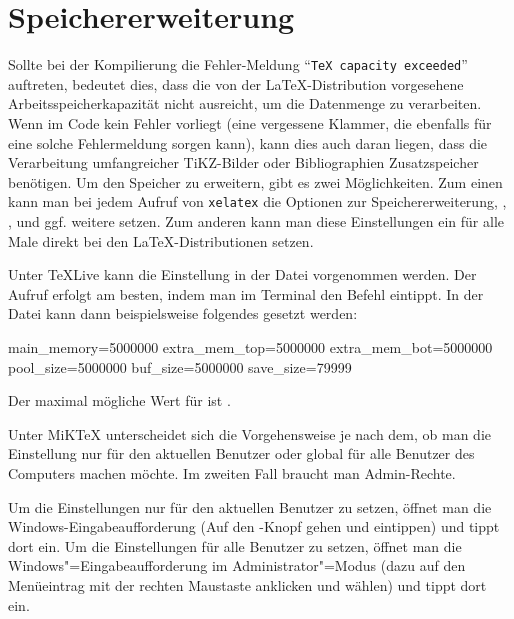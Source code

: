 \section{Speichererweiterung}%
%
\label{sec:Speichererweiterung}
%
Sollte bei der Kompilierung die Fehler-Meldung \enquote{\texttt{TeX capacity exceeded}} auftreten,
bedeutet dies, dass die von der \LaTeX-Distribution vorgesehene Arbeitsspeicherkapazität
nicht ausreicht, um die Datenmenge zu verarbeiten.
Wenn im Code kein Fehler vorliegt (\zB eine vergessene Klammer,
die ebenfalls für eine solche Fehlermeldung sorgen kann),
kann dies auch daran liegen, dass die Verarbeitung umfangreicher TiKZ-Bilder oder Bibliographien 
Zusatzspeicher benötigen.
Um den Speicher zu erweitern, gibt es zwei Möglichkeiten.
Zum einen kann man bei jedem Aufruf von \texttt{xelatex} die Optionen zur Speichererweiterung,
\zB {}, ,  und ggf. weitere setzen.
Zum anderen kann man diese Einstellungen ein für alle Male direkt bei den LaTeX-Distributionen setzen.

Unter TeXLive kann die Einstellung in der Datei
 vorgenommen werden.
Der Aufruf erfolgt am besten, indem man im Terminal den Befehl  eintippt.
In der Datei kann dann beispielsweise folgendes gesetzt werden:
\begin{latex}[caption={[Einstellungen zur erweiterten Speichernutzung]Einstellungen zur erweiterten Speichernutzung in der Datei \printfilepathquoted{texmf.cnf} bei TeXLive bzw. \printfilepathquoted{xelatex.ini} bei MiKTeX},label={lst:Speichererweiterung}]
main_memory=5000000
extra_mem_top=5000000
extra_mem_bot=5000000
pool_size=5000000
buf_size=5000000
save_size=79999
\end{latex}
Der maximal mögliche Wert für  \etc ist .

Unter MiKTeX unterscheidet sich die Vorgehensweise je nach dem,
ob man die Einstellung nur für den aktuellen Benutzer oder
global für alle Benutzer des Computers machen möchte.
Im zweiten Fall braucht man Admin-Rechte.

Um die Einstellungen nur für den aktuellen Benutzer zu setzen,
öffnet man die Windows-Eingabeaufforderung
(Auf den -Knopf gehen und  eintippen)
und tippt dort  ein.
Um die Einstellungen für alle Benutzer zu setzen,
öffnet man die Windows"=Eingabeaufforderung im Administrator"=Modus
(dazu auf den Menüeintrag  mit der rechten Maustaste anklicken und  wählen)
und tippt dort  ein.

